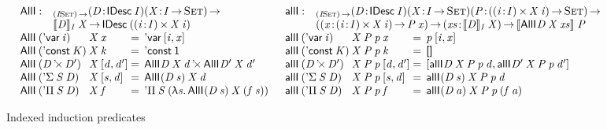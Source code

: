 \begin{figure*}

\[
\begin{array}{ll}
\stk{
\begin{array}{@{}ll}
\SYMBAllI : & _{\PI{\V{I}}{\Set}}
              \PITEL{\V{D}}{\IDesc{\V{I}}}
              \PI{\V{X}}{\V{I} \To \Set} \\
            & \idescop{\V{D}}{\V{I}}{\V{X}} \To
              \IDesc{(\SIGMA{\V{i}}{\V{I}}{\V{X}\: \V{i}})}
\end{array} \\
\begin{array}{@{}l@{}l@{\:=\:\:}l}
\AllI{\:}{(\DVar{\V{i}})}{& \V{X}}{\V{x}} &
    \DVar{\pair{\V{i}}{\V{x}}{}} \\
\AllI{\:}{(\DConst{\V{K}})}{& \V{X}}{\V{k}} &
    \DConst{\Unit} \\
\AllI{\:}{(\DProd{\V{D}}{\V{D'}})}{& \V{X}}{\pair{\V{d}}{\V{d'}}{}} &
    \DProd{\AllI{}{\V{D}}{\V{X}}{\V{d}}}{\AllI{}{\V{D'}}{\V{X}}{\V{d'}}} \\
\AllI{\:}{(\DSigma{\V{S}}{\V{D}})}{& \V{X}}{\pair{\V{s}}{\V{d}}{}} &
    \AllI{}{(\V{D}\: \V{s})}{\V{X}}{\V{d}} \\
\AllI{\:}{(\DPi{\V{S}}{\V{D}})}{& \V{X}}{\V{f}} &
    \DPi{\V{S}}{(\LAM{\V{s}} \AllI{}{(\V{D}\: \V{s})}{\V{X}}{(\V{f}\: \V{s})})}
\end{array}
}
&
\stk{
\begin{array}{@{}ll}
\SYMBallI : & _{\PI{\V{I}}{\Set}}
              \PITEL{\V{D}}{\IDesc{\V{I}}}
              \PITEL{\V{X}}{\V{I} \To \Set} 
              \PI{\V{P}}{(\SIGMA{\V{i}}{\V{I}}{\V{X}\: \V{i}}) \To \Set} \\
            & (\PI{\V{x}}{\SIGMA{\V{i}}{\V{I}}{\V{X}\: \V{i}}} \V{P}\: \V{x}) \To
              \PI{\V{xs}}{\idescop{\V{D}}{\V{I}}{\V{X}}} 
              \idescop{\AllI{}{\V{D}}{\V{X}}{\V{xs}}}{}{\V{P}}
\end{array} \\
\begin{array}{@{}l@{}l@{\:=\:\:}l}
\allI{\:}{(\DVar{\V{i}})}{& \V{X}}{\V{P}}{\V{p}}{\V{x}} &
    \V{p}\: \pair{\V{i}}{\V{x}}{} \\
\allI{\:}{(\DConst{\V{K}})}{& \V{X}}{\V{P}}{\V{p}}{\V{k}} &
    \void \\
\allI{\:}{(\DProd{\V{D}}{\V{D'}})}{& \V{X}}{\V{P}}{\V{p}}{\pair{\V{d}}{\V{d'}}{}} &
    \pair{\allI{}{\V{D}}{\V{X}}{\V{P}}{\V{p}}{\V{d}}}
         {\allI{}{\V{D'}}{\V{X}}{\V{P}}{\V{p}}{\V{d'}}}{} \\
\allI{\:}{(\DSigma{\V{S}}{\V{D}})}{& \V{X}}{\V{P}}{\V{p}}{\pair{\V{s}}{\V{d}}{}} &
    \allI{}{(\V{D}\: \V{s})}{\V{X}}{\V{P}}{\V{p}}{\V{d}} \\
\allI{\:}{(\DPi{\V{S}}{\V{D}})}{& \V{X}}{\V{P}}{\V{p}}{\V{f}} &
    \allI{}{(\V{D}\: \V{a})}{\V{X}}{\V{P}}{\V{p}}{(\V{f}\: \V{a})}
\end{array}
\end{array}
}
\]

\caption{Indexed induction predicates}
\label{fig:allI-predicates}

\end{figure*}



